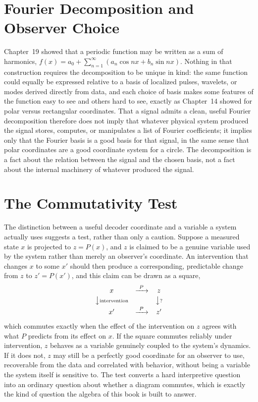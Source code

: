 \section{Fourier Decomposition and Observer Choice}

Chapter~19 showed that a periodic function may be written as a sum of
harmonics, $f(x) = a_0 + \sum_{n=1}^\infty (a_n\cos nx + b_n\sin nx)$.
Nothing in that construction requires the decomposition to be unique in
kind: the same function could equally be expressed relative to a basis of
localized pulses, wavelets, or modes derived directly from data, and each
choice of basis makes some features of the function easy to see and
others hard to see, exactly as Chapter~14 showed for polar versus
rectangular coordinates. That a signal admits a clean, useful Fourier
decomposition therefore does not imply that whatever physical system
produced the signal stores, computes, or manipulates a list of Fourier
coefficients; it implies only that the Fourier basis is a good basis for
that signal, in the same sense that polar coordinates are a good
coordinate system for a circle. The decomposition is a fact about the
relation between the signal and the chosen basis, not a fact about the
internal machinery of whatever produced the signal.

\section{The Commutativity Test}

The distinction between a useful decoder coordinate and a variable a
system actually uses suggests a test, rather than only a caution. Suppose
a measured state $x$ is projected to $z = P(x)$, and $z$ is claimed to be
a genuine variable used by the system rather than merely an observer's
coordinate. An intervention that changes $x$ to some $x'$ should then
produce a corresponding, predictable change from $z$ to $z' = P(x')$, and
this claim can be drawn as a square,
\[
\begin{array}{ccc}
x & \xrightarrow{\ P\ } & z \\[2pt]
\big\downarrow{\scriptstyle\text{intervention}} & & \big\downarrow{\scriptstyle ?} \\[2pt]
x' & \xrightarrow{\ P\ } & z'
\end{array}
\]
which commutes exactly when the effect of the intervention on $z$ agrees
with what $P$ predicts from its effect on $x$. If the square commutes
reliably under intervention, $z$ behaves as a variable genuinely coupled
to the system's dynamics. If it does not, $z$ may still be a perfectly
good coordinate for an observer to use, recoverable from the data and
correlated with behavior, without being a variable the system itself is
sensitive to. The test converts a hard interpretive question into an
ordinary question about whether a diagram commutes, which is exactly the
kind of question the algebra of this book is built to answer.


